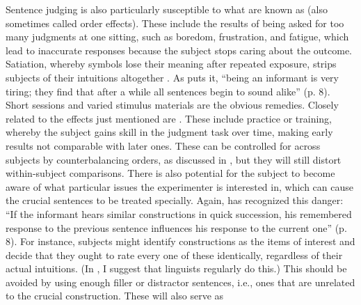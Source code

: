  Sentence judging is also particularly susceptible to what are known as  (also sometimes called order effects). These include the results of being asked for too many judgments at one sitting, such as boredom, frustration, and fatigue, which lead to inaccurate responses because the subject stops caring about the outcome. Satiation, whereby symbols lose their meaning after repeated exposure, strips subjects of their intuitions altogether \citep{QuirkEtAl1966}. As \citet{Carden1976a} puts it, ``being an informant is very tiring; they find that after a while all sentences begin to sound alike'' (p. 8). Short sessions and varied stimulus materials are the obvious remedies. Closely related to the effects just mentioned are . These include practice or training, whereby the subject gains skill in the judgment task over time, making early results not comparable with later ones. These can be controlled for across subjects by counterbalancing orders, as discussed in , but they will still distort within-subject comparisons. There is also potential for the subject to become aware of what particular issues the experimenter is interested in, which can cause the crucial sentences to be treated specially. Again, \citet{Carden1976a} has recognized this danger: ``If the informant hears similar constructions in quick succession, his remembered response to the previous sentence influences his response to the current one'' (p. 8). For instance, subjects might identify  constructions as the items of interest and decide that they ought to rate every one of these identically, regardless of their actual intuitions. (In , I suggest that linguists regularly do this.) This should be avoided by using enough filler or distractor sentences, i.e., ones that are unrelated to the crucial construction. These will also serve as
